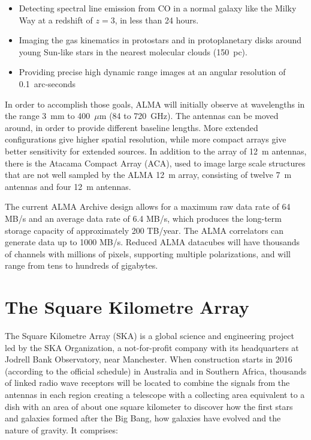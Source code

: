 \begin{itemize}

\item Detecting spectral line emission from CO in a normal galaxy like the Milky Way at a redshift of $z=3$, in less than 24 hours.

\item Imaging the gas kinematics in protostars and in protoplanetary disks around young Sun-like stars in the nearest molecular clouds
(150~pc).

\item Providing precise high dynamic range images at an angular resolution of
0.1~arc-seconds
\end{itemize}

In order to accomplish those goals,
ALMA will initially 
observe at wavelengths in the range 3~mm to
400~$\mu{}$m
(84 to 720~GHz). The antennas can be moved around, in order to
provide different %
baseline lengths. More extended
configurations %
give
higher %
spatial resolution,
while
more compact arrays give better sensitivity for extended sources. In addition to the array of
12~m
antennas, there is the Atacama Compact Array (ACA), used to image large scale structures that are not well sampled by the ALMA
12~m
array, consisting of twelve
7~m
antennas and four
12~m
antennas. 


The current ALMA Archive design allows for a maximum
raw
data rate of 64 MB/s and an average data rate
of 6.4 MB/s, which produces the long-term storage capacity of approximately 200 TB/year. The
ALMA correlators can
generate %
data
up to 1000 MB/s. 
Reduced ALMA datacubes will have thousands of channels with millions of pixels, supporting multiple polarizations, and will range from tens to hundreds of gigabytes.

\section{The Square Kilometre Array} %
\label{sec:the_square_kilometre_array}
The Square
Kilometre %
Array (SKA) %
is a global science and engineering project led by the SKA Organization, a not-for-profit company with its headquarters at Jodrell Bank Observatory, near Manchester. When construction starts in 2016 (according to
the official schedule) %
in Australia and in Southern Africa, thousands of linked radio wave receptors will be located to combine the signals from the antennas in each region creating a telescope with a collecting area equivalent to a dish with an area of about one square kilometer to discover how the first stars and galaxies formed after the Big Bang, how galaxies have evolved and the nature of gravity. It comprises:

